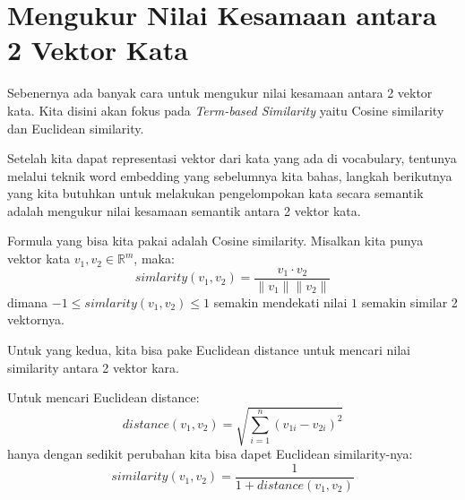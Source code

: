 \documentclass[a4paper,12pt]{tufte-handout}
\newcommand{\R}{\mathbb{R}} %
\begin{document}

\section{Mengukur Nilai Kesamaan antara 2 Vektor Kata}\label{sec:similarity}
Sebenernya ada banyak cara untuk mengukur nilai kesamaan antara 2 vektor 
kata.
Kita disini akan fokus pada \textit{Term-based Similarity} yaitu
Cosine similarity dan Euclidean similarity. \cite{li2004similarity}

Setelah kita dapat representasi vektor dari kata yang ada di 
vocabulary, tentunya melalui teknik word embedding yang
sebelumnya kita bahas, langkah berikutnya yang kita butuhkan
untuk melakukan pengelompokan kata secara semantik adalah mengukur nilai
kesamaan semantik antara 2 vektor kata.

Formula yang bisa kita pakai adalah Cosine similarity. Misalkan kita
punya vektor kata $v_{1}, v_{2} \in \R^{m}$, maka:
$$
simlarity\left(v_{1}, v_{2}\right) = \frac{v_{1}\cdot v_{2}}{
  \|v_{1}\|\| v_{2}\|
}
$$ 
dimana $-1 \leq simlarity\left(v_{1}, v_{2}\right) \leq 1$
semakin mendekati nilai $1$ semakin similar 2 vektornya.

Untuk yang kedua, kita bisa pake Euclidean distance untuk
mencari nilai similarity antara 2 vektor kara. 

Untuk mencari Euclidean distance:
$$
distance\left(v_{1}, v_{2}\right) = \sqrt{
  \sum_{i=1}^{n} \left(v_{1i} - v_{2i}\right)^{2}
}
$$
hanya dengan sedikit perubahan kita bisa dapet Euclidean similarity-nya:
$$
similarity\left(v_{1}, v_{2}\right) = \frac{1}{1+
  distance\left(v_{1}, v_{2}\right)
}
$$
\end{document}
